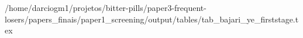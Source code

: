 /home/darciogm1/projetos/bitter-pills/paper3-frequent-losers/papers_finais/paper1_screening/output/tables/tab_bajari_ye_firststage.tex